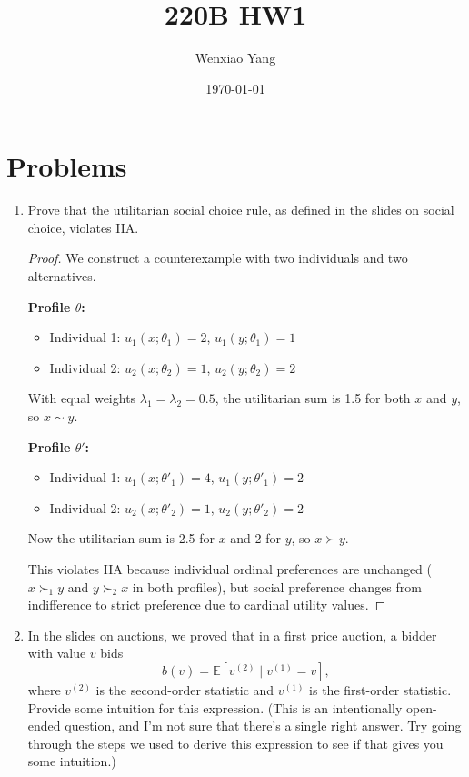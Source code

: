 \documentclass[12pt]{article}
\author{Wenxiao Yang}
\date{\today}
\begin{document}
\title{220B HW1}
\maketitle

\section*{Problems}

\begin{enumerate}

\item Prove that the utilitarian social choice rule, as defined in the slides on social choice, violates IIA.
\begin{proof}
We construct a counterexample with two individuals and two alternatives.

\noindent \textbf{Profile $\theta$:}
\begin{itemize}
    \item Individual 1: $u_1(x;\theta_1) = 2$, $u_1(y;\theta_1) = 1$ 
    \item Individual 2: $u_2(x;\theta_2) = 1$, $u_2(y;\theta_2) = 2$
\end{itemize}

With equal weights $\lambda_1 = \lambda_2 = 0.5$, the utilitarian sum is 1.5 for both $x$ and $y$, so $x \sim y$.

\noindent \textbf{Profile $\theta'$:}
\begin{itemize}
    \item Individual 1: $u_1(x;\theta'_1) = 4$, $u_1(y;\theta'_1) = 2$ 
    \item Individual 2: $u_2(x;\theta'_2) = 1$, $u_2(y;\theta'_2) = 2$
\end{itemize}

Now the utilitarian sum is 2.5 for $x$ and 2 for $y$, so $x \succ y$.

This violates IIA because individual ordinal preferences are unchanged ($x \succ_1 y$ and $y \succ_2 x$ in both profiles), but social preference changes from indifference to strict preference due to cardinal utility values.
\end{proof}
\item In the slides on auctions, we proved that in a first price auction, a bidder with value $v$ bids
\[
b(v) = \mathbb{E} \left[ v^{(2)} \mid v^{(1)} = v \right],
\]
where $v^{(2)}$ is the second-order statistic and $v^{(1)}$ is the first-order statistic. Provide some intuition for this expression. (This is an intentionally open-ended question, and I'm not sure that there's a single right answer. Try going through the steps we used to derive this expression to see if that gives you some intuition.)


\end{enumerate}
\end{document}
